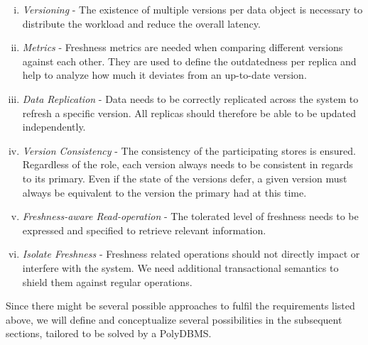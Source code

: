 \begin{enumerate}[(i)]
    \item \textit{Versioning} -                     The existence of multiple versions per data object is necessary to distribute the workload 
                                                    and reduce the overall latency.

    \item \textit{Metrics} -                        Freshness metrics are needed when comparing different versions against each other.
                                                    They are used to define the outdatedness per replica and help to analyze how much it deviates from an up-to-date version.

    \item \textit{Data Replication} -               Data needs to be correctly replicated across the system to refresh a specific version.
                                                    All replicas should therefore be able to be updated independently.

    \item \textit{Version Consistency} -            The consistency of the participating stores is ensured. Regardless of the role, each version always needs 
                                                    to be consistent in regards to its primary. Even if the state of the versions defer, 
                                                    a given version must always be equivalent to the version the primary had at this time.
                                            
    \item \textit{Freshness-aware Read-operation} - The tolerated level of freshness needs to be expressed and specified to retrieve relevant information.
    
    \item \textit{Isolate Freshness} -              Freshness related operations should not directly impact or interfere with the system. 
                                                    We need additional transactional semantics to shield them against regular operations.                                    

\end{enumerate}

Since there might be several possible approaches to fulfil the requirements listed above, 
we will define and conceptualize several possibilities in the subsequent sections, tailored to be solved by a PolyDBMS. 


